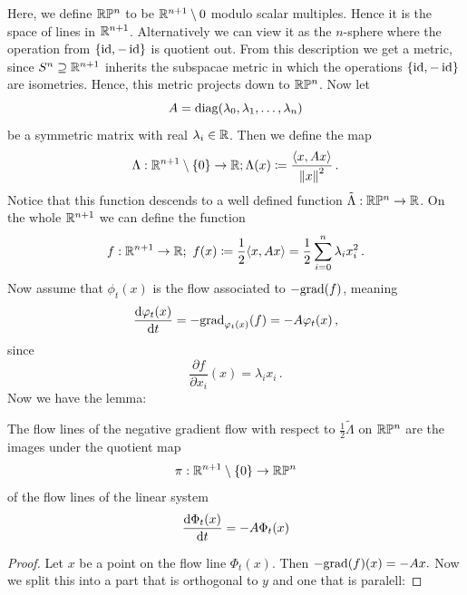    		\begin{example}
		Here, we define $\mathbb{R}\mathbb{P}^n$ to be $\mathbb{R}^{n+1}\setminus 0$ modulo scalar multiples. Hence it is the space of lines in $\mathbb{R}^{n+1}$. Alternatively we can view it as the $n$-sphere where the operation from $\{\operatorname{\mathrm{id}},-\operatorname{\mathrm{id}}\}$ is quotient out. From this description we get a metric, since $S^n\supseteq \mathbb{R}^{n+1}$ inherits the subspacae metric in which the operations $\{\operatorname{\mathrm{id}},-\operatorname{\mathrm{id}}\}$ are isometries. Hence, this metric projects down to $\mathbb{R}\mathbb{P}^n$. Now let
		\begin{equation*}
			A=\mathrm{diag}(\lambda_0,\lambda_1,\dots,\lambda_n)
		\end{equation*}be a symmetric matrix with real $\lambda_i\in \mathbb{R}$. Then we define the map
		\begin{equation*}
			\Lambda:\mathbb{R}^{n+1}\setminus\{0\}\to \mathbb{R}; \Lambda(x)\coloneq \frac{\langle x,Ax\rangle}{\left\lVert x\right\rVert^2}\,.
		\end{equation*}Notice that this function descends to a well defined function $\tilde{\Lambda}:\mathbb{R}\mathbb{P}^n\to \mathbb{R}$. On the whole $\mathbb{R}^{n+1}$ we can define the function
		\begin{equation*}
			f:\mathbb{R}^{n+1}\to \mathbb{R};~f(x)\coloneq \frac{1}{2}\langle x,Ax\rangle=\frac{1}{2}\sum_{i=0}^n\lambda_i x_i^2\,.
		\end{equation*} Now assume that $\phi_t(x)$ is the flow associated to $- \mathrm{grad}(f)$, meaning
		\begin{equation*}
			\frac{\mathop{}\!\mathrm{d} \varphi_t(x)}{\mathop{}\!\mathrm{d} t}=-\mathrm{grad}_{\varphi_t(x)}(f)=-A\varphi_t(x)\,,
		\end{equation*} since 
		\begin{equation*}
			\frac{\partial f}{\partial x_i}(x)=\lambda_ix_i\,.
		\end{equation*}
		Now we have the lemma: 
		\begin{lemma}
			The flow lines of the negative gradient flow with respect to $\frac{1}{2}\tilde{\Lambda}$ on $\mathbb{R}\mathbb{P}^n$ are the images under the quotient map 
			\begin{equation*}
				\pi: \mathbb{R}^{n+1}\setminus \{0\}\to \mathbb{R}\mathbb{P}^n
			\end{equation*}of the flow lines of the linear system
			\begin{equation*}
				\frac{\mathop{}\!\mathrm{d} \Phi_t(x)}{\mathop{}\!\mathrm{d} t}=-A \Phi_t(x)
			\end{equation*}
		\end{lemma}
		\begin{proof}
		Let $x$ be a point on the flow line $\Phi_t(x)$. Then $-\mathrm{grad}(f)(x)=-Ax.$ Now we split this into a part that is orthogonal to $y$ and one that is paralell:

\end{proof}
\end{example}
